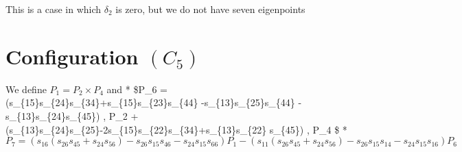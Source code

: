 \documentclass[11pt]{article}
\begin{document}
    This is a case in which \(\delta_2\) is zero, but we do not have seven
eigenpoints

    \hypertarget{configuration-c_5}{%
\section{\texorpdfstring{Configuration
\((C_5)\)}{Configuration (C\_5)}}\label{configuration-c_5}}

    We define \(P_1 = P_2 \times P_4\) and * \$P\_6 =
(s\_\{15\}s\_\{24\}s\_\{34\}+s\_\{15\}s\_\{23\}s\_\{44\}
-s\_\{13\}s\_\{25\}s\_\{44\} -s\_\{13\}s\_\{24\}s\_\{45\}) , P\_2 +
(s\_\{13\}s\_\{24\}s\_\{25\}-2s\_\{15\}s\_\{22\}s\_\{34\}+s\_\{13\}s\_\{22\}
s\_\{45\}) , P\_4 \$ *
\(P_7 = (s_{16}(s_{26}s_{45}+s_{24}s_{56})-s_{26}s_{15}s_{46}-s_{24}s_{15}s_{66})P_1 - (s_{11}(s_{26}s_{45}+s_{24}s_{56})-s_{26}s_{15}s_{14}-s_{24}s_{15}s_{16}) P_6\)
\end{document}
